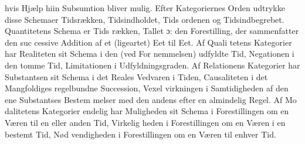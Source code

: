 \documentclass[12pt,a4paper]{book}
\begin{document}
hvis Hjælp hiin Subsumtion bliver mulig. Efter Kategoriernes
Orden udtrykke disse Schemaer Tidsrækken, Tidsindholdet, Tids\-%
ordenen og Tidsindbegrebet. Quantitetens Schema er Tids\-%
rækken, Tallet ɔ: den Forestilling, der sammenfatter den suc\-%
cessive Addition af et (ligeartet) Eet til Eet. Af Quali\-%
tetens Kategorier har Realiteten sit Schema i den (ved For\-%
nemmelsen) udfyldte Tid, Negationen i den tomme Tid,
Limitationen i Udfyldningsgraden. Af Relationens Kategorier
har Substantsen sit Schema i det Reales Vedvaren i Tiden,
Causaliteten i det Mangfoldiges regelbundne Succession, Vexel\-%
virkningen i Samtidigheden af den ene Substantses Bestem\-%
melser med den andens efter en almindelig Regel. Af Mo\-%
dalitetens Kategorier endelig har Muligheden sit Schema i
Forestillingen om en Væren til en eller anden Tid, Virkelig\-%
heden i Forestillingen om en Væren i en bestemt Tid, Nød\-%
vendigheden i Forestillingen om en Væren til enhver Tid.
\end{document}
